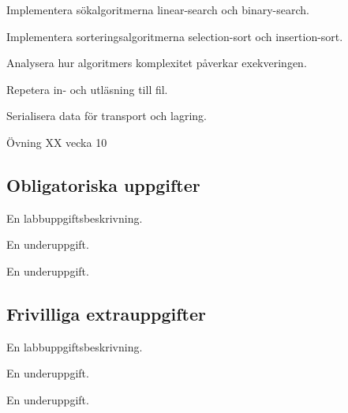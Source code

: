 

\Lab{\LabWeekTEN}

\begin{Goals}
\item Implementera sökalgoritmerna linear-search och binary-search.
\item Implementera sorteringsalgoritmerna selection-sort och insertion-sort.
\item Analysera hur algoritmers komplexitet påverkar exekveringen.
\item Repetera in- och utläsning till fil.
\item Serialisera data för transport och lagring.
\end{Goals}

\begin{Preparations}
\item Övning XX vecka 10
\end{Preparations}

\subsection{Obligatoriska uppgifter}

\Task En labbuppgiftsbeskrivning.

\Subtask En underuppgift.

\Subtask En underuppgift.

\subsection{Frivilliga extrauppgifter}

\Task En labbuppgiftsbeskrivning.

\Subtask En underuppgift.

\Subtask En underuppgift.
    